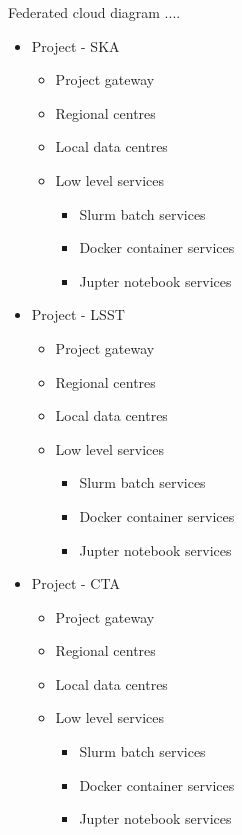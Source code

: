 \documentclass[11pt,a4paper]{ivoa}
\begin{document}
Federated cloud diagram ....

\begin{itemize}
    \item Project - SKA
    \begin{itemize}
        \item Project gateway
        \item Regional centres
        \item Local data centres
        \item Low level services
        \begin{itemize}
            \item Slurm batch services
            \item Docker container services
            \item Jupter notebook services
        \end{itemize}
    \end{itemize}
\end{itemize}

\begin{itemize}
    \item Project - LSST
    \begin{itemize}
        \item Project gateway
        \item Regional centres
        \item Local data centres
        \item Low level services
        \begin{itemize}
            \item Slurm batch services
            \item Docker container services
            \item Jupter notebook services
        \end{itemize}
    \end{itemize}
\end{itemize}

\begin{itemize}
    \item Project - CTA
    \begin{itemize}
        \item Project gateway
        \item Regional centres
        \item Local data centres
        \item Low level services
        \begin{itemize}
            \item Slurm batch services
            \item Docker container services
            \item Jupter notebook services
        \end{itemize}
    \end{itemize}
\end{itemize}
\end{document}

